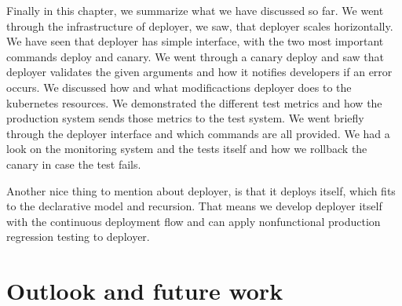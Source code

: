 Finally in this chapter, we summarize what we have discussed so far. We went through the
infrastructure of deployer, we saw, that deployer scales horizontally. We have seen that
deployer has simple interface, with the two most important commands deploy and canary. We
went through a canary deploy and saw that deployer validates the given arguments and how
it notifies developers if an error occurs. We discussed how and what modificactions
deployer does to the kubernetes resources. We demonstrated the different test metrics and
how the production system sends those metrics to the test system. We went briefly through
the deployer interface and which commands are all provided. We had a look on the
monitoring system and the tests itself and how we rollback the canary in case the test
fails.

Another nice thing to mention about deployer, is that it deploys itself, which fits to the
declarative model and recursion. That means we develop deployer itself with the continuous
deployment flow and can apply nonfunctional production regression testing to deployer.



\section{Outlook and future work}







